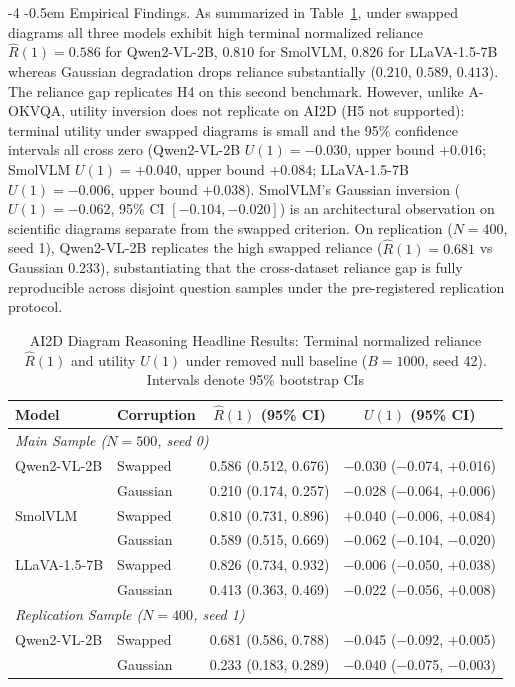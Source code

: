 \documentclass[graybox]{svmult}
\makeatletter
\renewcommand\paragraph{\@startsection{paragraph}{4}{\z@}%
  {-4\p@ \@plus -1\p@ \@minus -1\p@}%
  {-0.5em}%
  {\normalfont\normalsize\bfseries}}
\makeatother
\begin{document}
\paragraph{Empirical Findings.}
As summarized in Table~\ref{tab:ai2d_headline}, under swapped diagrams all three models exhibit high terminal normalized reliance $\hat{R}(1) = 0.586$ for Qwen2-VL-2B, $0.810$ for SmolVLM, $0.826$ for LLaVA-1.5-7B whereas Gaussian degradation drops reliance substantially ($0.210$, $0.589$, $0.413$). The reliance gap replicates H4 on this second benchmark. However, unlike A-OKVQA, utility inversion does not replicate on AI2D (H5 not supported): terminal utility under swapped diagrams is small and the 95\% confidence intervals all cross zero (Qwen2-VL-2B $U(1) = -0.030$, upper bound $+0.016$; SmolVLM $U(1) = +0.040$, upper bound $+0.084$; LLaVA-1.5-7B $U(1) = -0.006$, upper bound $+0.038$). SmolVLM's Gaussian inversion ($U(1) = -0.062$, 95\% CI $[-0.104, -0.020]$) is an architectural observation on scientific diagrams separate from the swapped criterion. On replication ($N = 400$, seed 1), Qwen2-VL-2B replicates the high swapped reliance ($\hat{R}(1) = 0.681$ vs Gaussian $0.233$), substantiating that the cross-dataset reliance gap is fully reproducible across disjoint question samples under the pre-registered replication protocol.

\begin{table}[tb]
\centering
\caption{AI2D Diagram Reasoning Headline Results: Terminal normalized reliance $\hat{R}(1)$ and utility $U(1)$ under removed null baseline ($B = 1000$, seed 42). Intervals denote 95\% bootstrap CIs}
\label{tab:ai2d_headline}
{\footnotesize\setlength{\tabcolsep}{3pt}%
\begin{tabular}{llcc}
\toprule
\textbf{Model} & \textbf{Corruption} & $\hat{R}(1)$ (95\% CI) & $U(1)$ (95\% CI) \\
\midrule
\multicolumn{4}{l}{\textit{Main Sample ($N=500$, seed 0)}} \\
\midrule
Qwen2-VL-2B  & Swapped  & 0.586 (0.512, 0.676) & $-$0.030 ($-$0.074, $+$0.016) \\
              & Gaussian & 0.210 (0.174, 0.257) & $-$0.028 ($-$0.064, $+$0.006) \\
SmolVLM      & Swapped  & 0.810 (0.731, 0.896) & $+$0.040 ($-$0.006, $+$0.084) \\
              & Gaussian & 0.589 (0.515, 0.669) & $-$0.062 ($-$0.104, $-$0.020) \\
LLaVA-1.5-7B & Swapped  & 0.826 (0.734, 0.932) & $-$0.006 ($-$0.050, $+$0.038) \\
              & Gaussian & 0.413 (0.363, 0.469) & $-$0.022 ($-$0.056, $+$0.008) \\
\midrule
\multicolumn{4}{l}{\textit{Replication Sample ($N=400$, seed 1)}} \\
\midrule
Qwen2-VL-2B  & Swapped  & 0.681 (0.586, 0.788) & $-$0.045 ($-$0.092, $+$0.005) \\
              & Gaussian & 0.233 (0.183, 0.289) & $-$0.040 ($-$0.075, $-$0.003) \\
\bottomrule
\end{tabular}}
\end{table}
\end{document}
